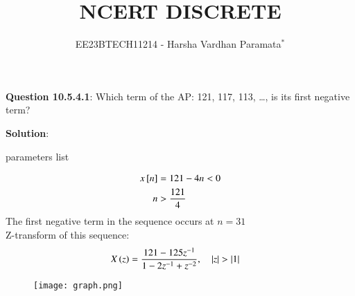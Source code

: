 \documentclass[journal,12pt,twocolumn]{IEEEtran}
\theoremstyle{remark}
\begin{document}

\vspace{3cm}

\title{NCERT DISCRETE}
\author{EE23BTECH11214 - Harsha Vardhan Paramata$^{*}$%
}
\maketitle
\newpage
\bigskip

\renewcommand{\thefigure}{\theenumi}
\renewcommand{\thetable}{\theenumi}

\textbf{Question 10.5.4.1}:
Which term of the AP: 121, 117, 113, \ldots, is its first negative term?

\textbf{Solution}:
\begin{table}[htbp]
\centering

\caption{parameters list}
\end{table}

\begin{align}
x{}\left[n\right] &= 121 - 4n < 0 \\
n &> \frac{121}{4} 
\end{align}
The first negative term in the sequence occurs at 
$n = 31$  \\
Z-transform of this sequence:
\begin{align}
    X\left(z\right) &= \frac{121 - 125z^{-1}}{1 - 2z^{-1} + z^{-2}}
 ,\quad \left\vert z\right\vert > \left\vert1\right\vert
\end{align}
\pagebreak
\begin{figure}[!ht] 
\centering
\texttt{[image: graph.png]}
\label{fig:Graph1}
\end{figure}
\end{document}

